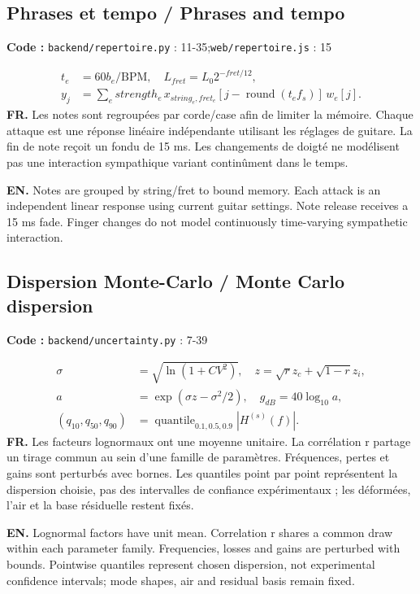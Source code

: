 \documentclass[10pt,a4paper]{article}
\newcommand{\FR}[1]{\textbf{FR.} #1\par}\newcommand{\EN}[1]{{\selectlanguage{english}\textbf{EN.} #1\par}}
\newcommand{\loc}[1]{{\small\color{ink}\textbf{Code :} #1\par}}
\begin{document}
\begin{samepage}\subsection{Phrases et tempo / Phrases and tempo}
\loc{\texttt{backend/repertoire.py} : 11-35;\allowbreak\quad \texttt{web/repertoire.js} : 15}
\begin{align}t_e&=60b_e/\mathrm{BPM},\quad L_{fret}=L_0 2^{-fret/12},\\
y_j&=\sum_e strength_e\,x_{string_e,fret_e}[j-\operatorname{round}(t_ef_s)]\,w_e[j].\end{align}
\FR{Les notes sont regroupées par corde/case afin de limiter la mémoire. Chaque attaque est une réponse linéaire indépendante utilisant les réglages de guitare. La fin de note reçoit un fondu de 15 ms. Les changements de doigté ne modélisent pas une interaction sympathique variant continûment dans le temps.}
\EN{Notes are grouped by string/fret to bound memory. Each attack is an independent linear response using current guitar settings. Note release receives a 15 ms fade. Finger changes do not model continuously time-varying sympathetic interaction.}
\end{samepage}
\begin{samepage}\subsection{Dispersion Monte-Carlo / Monte Carlo dispersion}
\loc{\texttt{backend/uncertainty.py} : 7-39}
\begin{align}\sigma&=\sqrt{\ln(1+CV^2)},\quad z=\sqrt{r}z_c+\sqrt{1-r}z_i,\\
a&=\exp(\sigma z-\sigma^2/2),\quad g_{dB}=40\log_{10}a,\\
(q_{10},q_{50},q_{90})&=\operatorname{quantile}_{0.1,0.5,0.9}|H^{(s)}(f)|.\end{align}
\FR{Les facteurs lognormaux ont une moyenne unitaire. La corrélation r partage un tirage commun au sein d’une famille de paramètres. Fréquences, pertes et gains sont perturbés avec bornes. Les quantiles point par point représentent la dispersion choisie, pas des intervalles de confiance expérimentaux ; les déformées, l’air et la base résiduelle restent fixés.}
\EN{Lognormal factors have unit mean. Correlation r shares a common draw within each parameter family. Frequencies, losses and gains are perturbed with bounds. Pointwise quantiles represent chosen dispersion, not experimental confidence intervals; mode shapes, air and residual basis remain fixed.}
\end{samepage}
\end{document}

